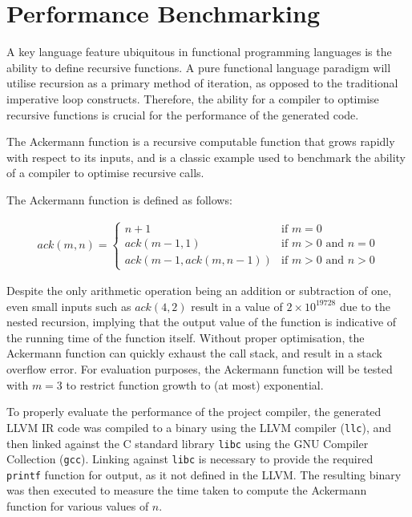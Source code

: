 \section{Performance Benchmarking}

A key language feature ubiquitous in functional programming languages is the ability to define
recursive functions. A pure functional language paradigm will utilise recursion as a primary method
of iteration, as opposed to the traditional imperative loop constructs. Therefore, the ability for a
compiler to optimise recursive functions is crucial for the performance of the generated code.

The Ackermann function is a recursive computable function that grows rapidly with respect to its
inputs, and is a classic example used to benchmark the ability of a compiler to optimise recursive
calls.

The Ackermann function is defined as follows:

\singlespacing
\vspace{-0.7cm}
\begin{align*}
    ack(m, n) = \begin{cases}
        n + 1 & \text{if } m = 0 \\
        ack(m - 1, 1) & \text{if } m > 0 \text{ and } n = 0 \\
        ack(m - 1, ack(m, n - 1)) & \text{if } m > 0 \text{ and } n > 0
    \end{cases}
\end{align*}
\doublespacing

Despite the only arithmetic operation being an addition or subtraction of one, even small inputs
such as $ack(4,2)$ result in a value of $2 \times 10^{19728}$ due to the nested recursion, implying
that the output value of the function is indicative of the running time of the function itself.
Without proper optimisation, the Ackermann function can quickly exhaust the call stack, and result
in a stack overflow error. For evaluation purposes, the Ackermann function will be tested with $m=3$
to restrict function growth to (at most) exponential.

To properly evaluate the performance of the project compiler, the generated LLVM IR code was
compiled to a binary using the LLVM compiler (\texttt{llc}), and then linked against the C standard
library \texttt{libc} using the GNU Compiler Collection (\texttt{gcc}). Linking against
\texttt{libc} is necessary to provide the required \texttt{printf} function for output, as it not
defined in the LLVM. The resulting binary was then executed to measure the time taken to compute the
Ackermann function for various values of $n$.

